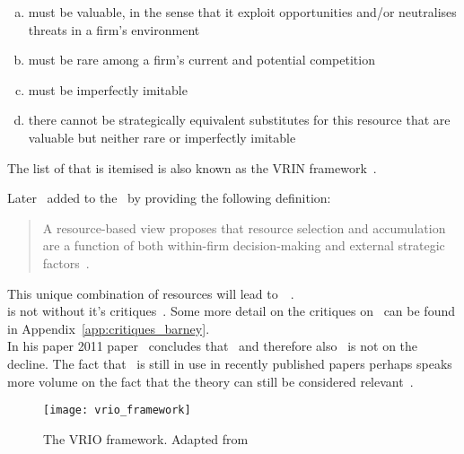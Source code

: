 \begin{enumerate}[(a)]
   \setlength{\itemsep}{1pt}
\item must be valuable, in the sense that it exploit opportunities and/or neutralises threats in a firm’s environment
\item must be rare among a firm’s current and potential competition 
\item must be imperfectly imitable
\item  there cannot be strategically equivalent substitutes for this resource that are valuable but neither rare or imperfectly imitable 
\end{enumerate} 
The list of that is itemised is also known as the VRIN framework~\citep{Barney:1991ur}.
 

Later~\citep{Oliver:1997wj} added to the \rbt~by providing the following definition:
\begin{quote}
A resource-based view proposes that resource selection and accumulation are a function of both within-firm decision-making and external strategic factors~\citep{Oliver:1997wj}.
\end{quote}
This unique combination of resources will lead to~\ca~\cite{Barney:1991ur}. \\
\rbt is not without it's critiques~\citep{Narayanan:2005wy,Kraaijenbrink:2009bu,Priem:2001vd,Dung:2012wh}.
Some more detail on the critiques on~\cite{Barney:1991ur} can be found in Appendix~\ref{app:critiques_barney}.\\
In his paper 2011 paper~\cite{Barney:2011jp} concludes that \rbt~and therefore also \rbv~is not on the decline.
The fact that \rbt~is still in use in recently published papers perhaps speaks more volume on the fact that the theory can still be considered relevant~\citep{Mukherjee:2013vz,Hoskisson:2012jk,Lockett:2013jr}.

\begin{figure}[htbp] 
	\centering
	\texttt{[image: vrio\_framework]}
 	\caption[The VRIO framework]{The VRIO framework. Adapted from~\citep{rothaermel2012strategic}}\label{fig:VRIO}
\end{figure}


